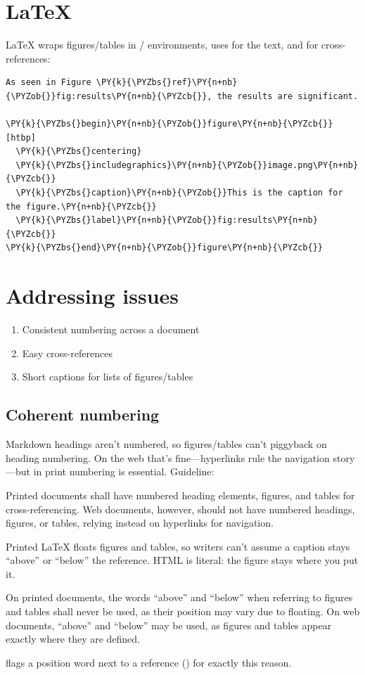 \documentclass[a4paper,twoside]{article}
\begin{document}
\section{\LaTeX{}}
\LaTeX{} wraps figures/tables in / environments, uses  for the text, and  for cross-references:
\begin{tscode}[lang=latex, engine=pygments]
\begin{Verbatim}[commandchars=\\\{\},breaklines, breakanywhere, commandchars=\\\{\}]
As seen in Figure \PY{k}{\PYZbs{}ref}\PY{n+nb}{\PYZob{}}fig:results\PY{n+nb}{\PYZcb{}}, the results are significant.

\PY{k}{\PYZbs{}begin}\PY{n+nb}{\PYZob{}}figure\PY{n+nb}{\PYZcb{}}[htbp]
  \PY{k}{\PYZbs{}centering}
  \PY{k}{\PYZbs{}includegraphics}\PY{n+nb}{\PYZob{}}image.png\PY{n+nb}{\PYZcb{}}
  \PY{k}{\PYZbs{}caption}\PY{n+nb}{\PYZob{}}This is the caption for the figure.\PY{n+nb}{\PYZcb{}}
  \PY{k}{\PYZbs{}label}\PY{n+nb}{\PYZob{}}fig:results\PY{n+nb}{\PYZcb{}}
\PY{k}{\PYZbs{}end}\PY{n+nb}{\PYZob{}}figure\PY{n+nb}{\PYZcb{}}
\end{Verbatim}
\end{tscode}
\section{Addressing issues}
\begin{enumerate}
\item Consistent numbering across a document
\item Easy cross-references
\item Short captions for lists of figures/tables
\end{enumerate}
\subsection{Coherent numbering}
Markdown headings aren't numbered, so figures/tables can't piggyback on heading numbering. On the web that's fine---hyperlinks rule the navigation story---but in print numbering is essential. Guideline:
\begin{displayquote}
Printed documents shall have numbered heading elements, figures, and tables for cross-referencing. Web documents, however, should not have numbered headings, figures, or tables, relying instead on hyperlinks for navigation.
\end{displayquote}
Printed \LaTeX{} floats figures and tables, so writers can't assume a caption stays ``above'' or ``below'' the reference. HTML is literal: the figure stays where you put it.
\begin{displayquote}
On printed documents, the words \enquote{above} and \enquote{below} when referring to figures and tables shall never be used, as their position may vary due to floating. On web documents, \enquote{above} and \enquote{below} may be used, as figures and tables appear exactly where they are defined.
\end{displayquote}
 flags a position word next to a reference () for
exactly this reason.
\end{document}
